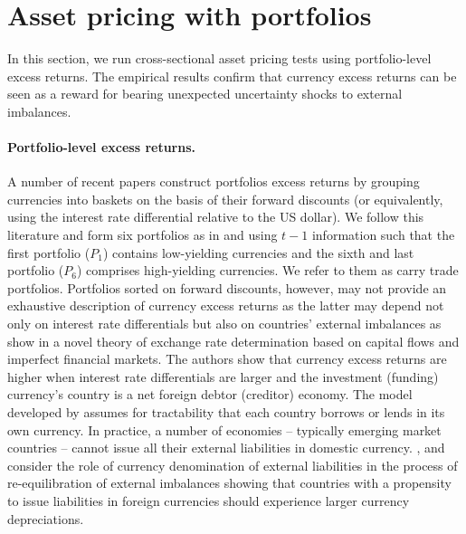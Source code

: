 \section{Asset pricing with portfolios} \label{sec:ap_portfolio_UNC_CAR}
In this section, we run cross-sectional asset pricing tests using portfolio-level excess returns. The empirical results confirm that currency excess returns can be seen as a reward for bearing unexpected uncertainty shocks to external imbalances.

\paragraph{Portfolio-level excess returns.}
A number of recent papers construct portfolios excess returns by grouping currencies into baskets on the basis of their forward discounts (or equivalently, using the interest rate differential relative to the US dollar). We follow this literature and form six portfolios as in \citet{lustig_etal2011} and \citet{menkhoff_etal2012} using $t-1$ information such that the first portfolio ($P_1$) contains low-yielding currencies and the sixth and last portfolio ($P_6$) comprises high-yielding currencies. We refer to them as carry trade portfolios. Portfolios sorted on forward discounts, however, may not provide an exhaustive description of currency excess returns as the latter may depend not only on interest rate differentials but also on countries' external imbalances as \citet{gabaix_maggiori2015} show in a novel theory of exchange rate determination based on capital flows and imperfect financial markets. The authors show that currency excess returns are higher when interest rate differentials are larger and the investment (funding) currency's country is a net foreign debtor (creditor) economy. The model developed by \citet{gabaix_maggiori2015} assumes for tractability that each country borrows or lends in its own currency. In practice, a number of economies -- typically emerging market countries -- cannot issue all their external liabilities in domestic currency. \citet{gourinchas_rey2007}, \citet{gourinchas:2008} and \citet{lane_shambaugh:2010} consider the role of currency denomination of external liabilities in the process of re-equilibration of external imbalances showing that countries with a propensity to issue liabilities in foreign currencies should experience larger currency depreciations.

